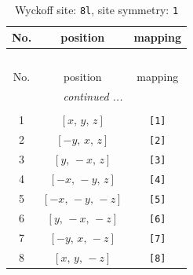 \documentclass[fleqn,8pt]{jsarticle}
\begin{document}
\renewcommand{\arraystretch}{1.2}
\begin{longtable}{ccc}
\caption{Wyckoff site: {\tt 8l}, site symmetry: {\tt 1}}
 \\
 \hline \hline
No. & position & mapping \\ \hline \endfirsthead

\multicolumn{2}{l}{\tablename\ \thetable{}} \\
 \hline \hline
No. & position & mapping \\ \hline \endhead

 \hline \hline
\multicolumn{2}{r}{\footnotesize\it continued ...} \\ \endfoot

 \hline \hline
\multicolumn{2}{r}{} \\ \endlastfoot

1 & $\left[ x,\, y,\, z \right]$ & {\tt [1]} \\ \hline
2 & $\left[ - y,\, x,\, z \right]$ & {\tt [2]} \\ \hline
3 & $\left[ y,\, - x,\, z \right]$ & {\tt [3]} \\ \hline
4 & $\left[ - x,\, - y,\, z \right]$ & {\tt [4]} \\ \hline
5 & $\left[ - x,\, - y,\, - z \right]$ & {\tt [5]} \\ \hline
6 & $\left[ y,\, - x,\, - z \right]$ & {\tt [6]} \\ \hline
7 & $\left[ - y,\, x,\, - z \right]$ & {\tt [7]} \\ \hline
8 & $\left[ x,\, y,\, - z \right]$ & {\tt [8]} \\
\end{longtable}
\end{document}
